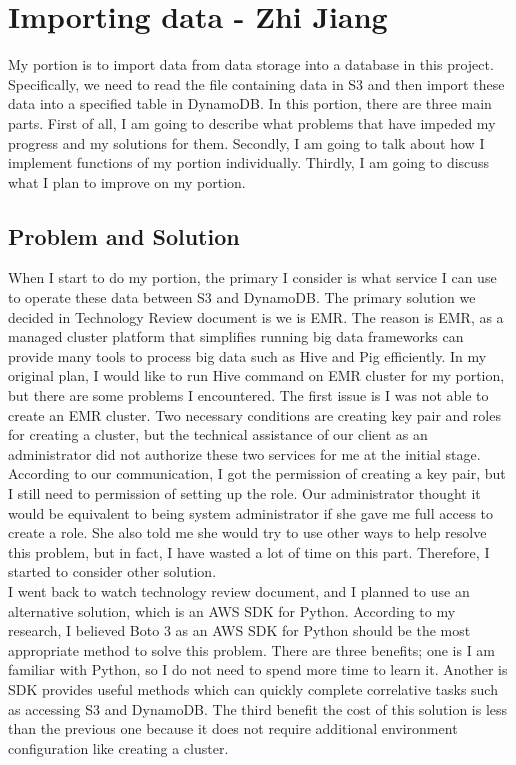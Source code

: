 \section{Importing data - Zhi Jiang}
My portion is to import data from data storage into a database in this project. Specifically, we need to read the file containing data in S3 and then import these data into a specified table in DynamoDB. In this portion, there are three main parts. First of all, I am going to describe what problems that have impeded my progress and my solutions for them. Secondly, I am going to talk about how I implement functions of my portion individually. Thirdly,  I am going to discuss what I plan to improve on my portion.

\subsection{Problem and Solution}
When I start to do my portion, the primary I consider is what service I can use to operate these data between S3 and DynamoDB. The primary solution we decided in Technology Review document is we is EMR. The reason is EMR, as a managed cluster platform that simplifies running big data frameworks can provide many tools to process big data such as Hive and Pig efficiently. In my original plan, I would like to run Hive command on EMR cluster for my portion, but there are some problems I encountered. The first issue is I was not able to create an EMR cluster. Two necessary conditions are creating key pair and roles for creating a cluster, but the technical assistance of our client as an administrator did not authorize these two services for me at the initial stage. According to our communication, I got the permission of creating a key pair, but I still need to permission of setting up the role. Our administrator thought it would be equivalent to being system administrator if she gave me full access to create a role. She also told me she would try to use other ways to help resolve this problem, but in fact, I have wasted a lot of time on this part. Therefore, I started to consider other solution.\\ 

\noindent I went back to watch technology review document, and I planned to use an alternative solution, which is an AWS SDK for Python. According to my research, I believed Boto 3 as an AWS SDK for Python should be the most appropriate method to solve this problem. There are three benefits; one is I am familiar with Python, so I do not need to spend more time to learn it. Another is SDK provides useful methods which can quickly complete correlative tasks such as accessing S3 and DynamoDB. The third benefit the cost of this solution is less than the previous one because it does not require additional environment configuration like creating a cluster.

